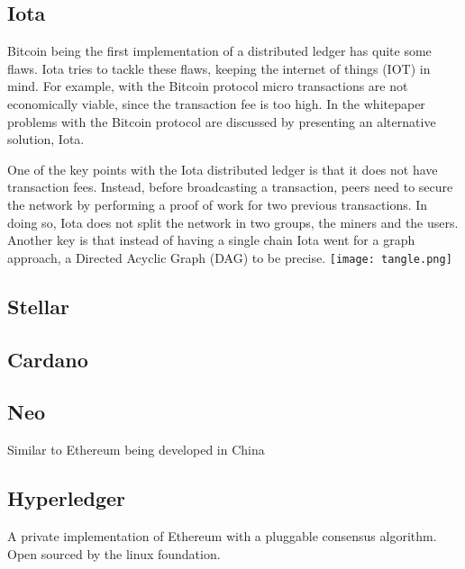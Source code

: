 \subsection{Iota}
Bitcoin being the first implementation of a distributed ledger has quite some flaws. Iota tries to tackle these flaws, keeping the internet of things (IOT) in mind. For example, with the Bitcoin protocol micro transactions are not economically viable, since the transaction fee is too high. In the whitepaper \cite{iota_wp} problems with the Bitcoin protocol are discussed by presenting an alternative solution, Iota.

One of the key points with the Iota distributed ledger is that it does not have transaction fees. Instead, before broadcasting a transaction, peers need to secure the network by performing a proof of work for two previous transactions. In doing so, Iota does not split the network in two groups, the miners and the users. Another key is that instead of having a single chain Iota went for a graph approach, a Directed Acyclic Graph (DAG) to be precise.
\texttt{[image: tangle.png]}
\subsection{Stellar}

\subsection{Cardano}

\subsection{Neo}
Similar to Ethereum being developed in China

\subsection{Hyperledger}
A private implementation of Ethereum with a pluggable consensus algorithm. Open sourced by the linux foundation.

